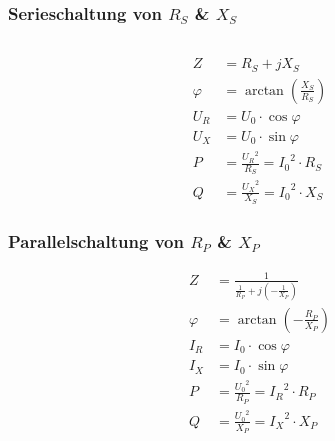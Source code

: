 	\begin{minipage}{0.49\textwidth}
		\subsubsection{Serieschaltung von $R_S$ \& $X_S$}
		\begin{tabular}{lll}
		\end{tabular}
		\begin{align*} 
			Z 		&	= R_S + jX_S 				  \\
			\varphi &	= \arctan(\frac{X_S}{R_S}) 	  \\
			U_R 	&	= U_0 \cdot \cos\varphi 	  \\
			U_X		&	= U_0 \cdot \sin\varphi 	  \\
			P		&	= \frac{{U_R}^2}{R_S} = {I_0}^2\cdot R_S  \\
			Q		&	= \frac{{U_X}^2}{X_S} = {I_0}^2\cdot X_S					
		\end{align*}
	\end{minipage}
	\begin{minipage}{0.49\textwidth}
	\subsubsection{Parallelschaltung von $R_P$ \& $X_P$}
	\begin{align*}
		Z 		&	= \frac{1}{\frac{1}{R_P}+j(-\frac{1}{X_P})}	\\
		\varphi &	= \arctan(- \frac{R_P}{X_P})				\\
		I_R 	&	= I_0 \cdot \cos\varphi						\\
		I_X		&	= I_0 \cdot \sin\varphi						\\
		P		&	= \frac{{U_0}^2}{R_P} = {I_R}^2\cdot R_P	    \\
		Q		&	= \frac{{U_0}^2}{X_P} = {I_X}^2\cdot X_P
	\end{align*}
	\end{minipage}
	
		

